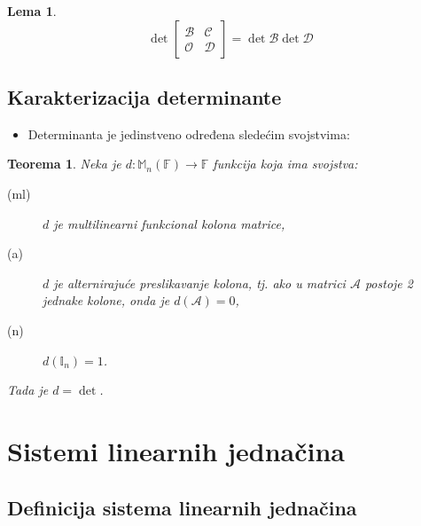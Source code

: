 \documentclass[a4paper,12pt,twoside]{report}
\newtheorem{theorem}{Teorema}[section]
\newtheorem{lemma}{Lema}[section]
\numberwithin{algorithm}{section}
\begin{document}
\begin{lemma}
    \[ \det \begin{bmatrix}
        \mathcal{B} & \mathcal{C} \\
        \mathcal{O} & \mathcal{D}
    \end{bmatrix} = \det \mathcal{B}\det\mathcal{D}\]
\end{lemma}

\subsection{Karakterizacija determinante}

\begin{itemize}
    \item Determinanta je jedinstveno određena sledećim svojstvima:
\end{itemize}

\begin{theorem}
    Neka je $d: \mathbb{M}_n(\mathbb{F}) \to \mathbb{F}$ funkcija koja ima svojstva:
    \begin{description}
        \item [(ml)] $d$ je multilinearni funkcional kolona matrice,
        \item [(a)] $d$ je alternirajuće preslikavanje kolona, tj. ako u matrici $\mathcal{A}$ postoje 2 jednake kolone, onda je ${d}(\mathcal{A}) = 0$, 
        \item [(n)] $d(\mathbb{I}_n)=1$.
    \end{description}
    Tada je $d = \det$.
\end{theorem}

\newpage

\section{Sistemi linearnih jednačina}

\subsection{Definicija sistema linearnih jednačina}
\end{document}
